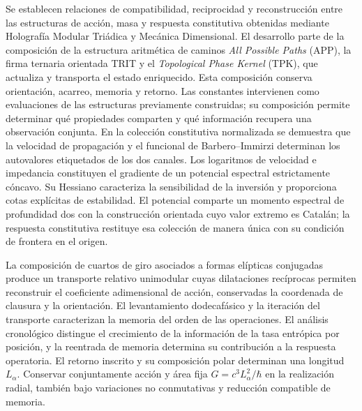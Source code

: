\begingroup\fontsize{9.5}{10.7}\selectfont\setlength{\parskip}{1.5pt}\renewenvironment{abstract}{\begin{center}\bfseries\abstractname\end{center}\noindent}{\par}\begin{abstract}
Se establecen relaciones de compatibilidad, reciprocidad y reconstrucción
entre las estructuras de acción, masa y respuesta constitutiva obtenidas
mediante Holografía Modular Triádica y Mecánica Dimensional. El desarrollo
parte de la composición de la estructura aritmética de caminos
\emph{All Possible Paths} (APP), la firma ternaria orientada TRIT y el
\emph{Topological Phase Kernel} (TPK), que actualiza y transporta el estado
enriquecido. Esta composición conserva orientación, acarreo, memoria y
retorno. Las constantes intervienen como evaluaciones de las
estructuras previamente construidas; su composición permite determinar qué
propiedades comparten y qué información recupera una observación conjunta.
En la colección constitutiva normalizada se demuestra que la velocidad de
propagación y el funcional de Barbero--Immirzi determinan los autovalores
etiquetados de los dos canales. Los logaritmos de velocidad e impedancia
constituyen el gradiente de un potencial espectral estrictamente cóncavo.
Su Hessiano caracteriza la sensibilidad de la inversión y proporciona cotas
explícitas de estabilidad. El potencial comparte un momento espectral de
profundidad dos con la construcción orientada cuyo valor extremo es Catalán;
la respuesta constitutiva restituye esa colección de manera única con su
condición de frontera en el origen.

La composición de cuartos de giro asociados a formas elípticas conjugadas
produce un transporte relativo unimodular cuyas dilataciones recíprocas
permiten reconstruir el coeficiente adimensional de acción, conservadas la
coordenada de clausura y la orientación. El levantamiento dodecafásico y la
iteración del transporte caracterizan la memoria del orden de las
operaciones. El análisis cronológico distingue el crecimiento de la
información de la tasa entrópica por posición, y la reentrada de memoria
determina su contribución a la respuesta operatoria. El retorno inscrito y
su composición polar determinan una longitud $L_\alpha$. Conservar
conjuntamente acción y área fija $G=c^3L_\alpha^2/\hbar$ en la realización
radial, también bajo variaciones no conmutativas y reducción compatible
de memoria.


\end{abstract}
